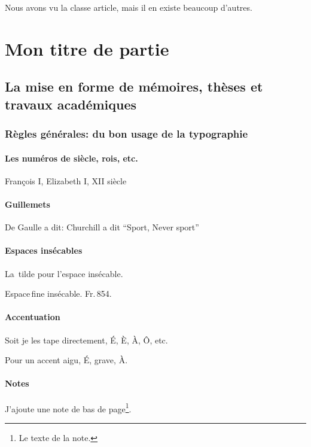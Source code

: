 \documentclass[12pt,a4paper]{book} %
\begin{document}
Nous avons vu la classe article, mais il en existe beaucoup d'autres.

\part{Mon titre de partie}

\chapter[Mémoires et travaux académiques]{La mise en forme de mémoires, thèses et travaux académiques}

\section{Règles générales: du bon usage de la typographie}

\subsection{Les numéros de siècle, rois, etc.}

François I\ier{}, Elizabeth I\iere{}, XII\ieme{} siècle

\subsection{Guillemets}

De Gaulle a dit:
\og Churchill a dit ``Sport, Never sport'' \fg{} 

\subsection{Espaces insécables}

La~tilde pour l'espace insécable.

Espace\,fine insécable. Fr.\,854.

\subsection{Accentuation}
Soit je les tape directement, É, È, À, Ô, etc.

Pour un accent aigu, \'E, grave, \`A.

\subsection{Notes}

J'ajoute une note de bas de page\footnote{Le texte de la note.}.
\end{document}
